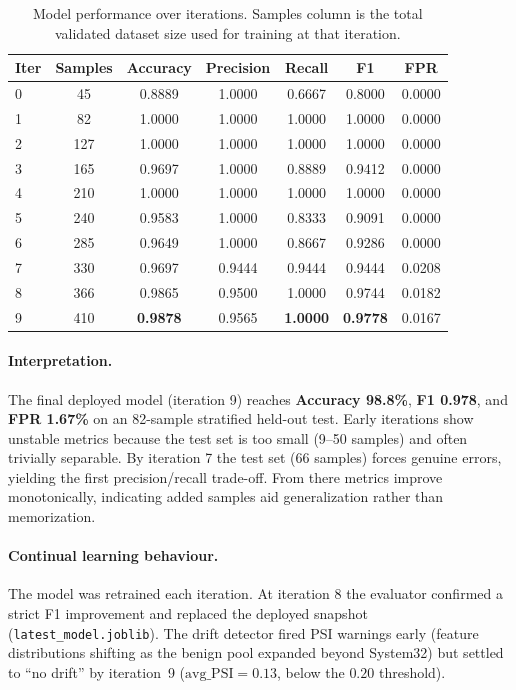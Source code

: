 \documentclass[12pt,a4paper]{article}
\begin{document}
\begin{table}[H]
\centering
\caption{Model performance over iterations. Samples column is the total validated dataset size used for training at that iteration.}
\label{tab:results}
\begin{tabular}{lcccccc}
\toprule
\textbf{Iter} & \textbf{Samples} & \textbf{Accuracy} & \textbf{Precision} & \textbf{Recall} & \textbf{F1} & \textbf{FPR} \\
\midrule
0 & 45  & 0.8889 & 1.0000 & 0.6667 & 0.8000 & 0.0000 \\
1 & 82  & 1.0000 & 1.0000 & 1.0000 & 1.0000 & 0.0000 \\
2 & 127 & 1.0000 & 1.0000 & 1.0000 & 1.0000 & 0.0000 \\
3 & 165 & 0.9697 & 1.0000 & 0.8889 & 0.9412 & 0.0000 \\
4 & 210 & 1.0000 & 1.0000 & 1.0000 & 1.0000 & 0.0000 \\
5 & 240 & 0.9583 & 1.0000 & 0.8333 & 0.9091 & 0.0000 \\
6 & 285 & 0.9649 & 1.0000 & 0.8667 & 0.9286 & 0.0000 \\
7 & 330 & 0.9697 & 0.9444 & 0.9444 & 0.9444 & 0.0208 \\
8 & 366 & 0.9865 & 0.9500 & 1.0000 & 0.9744 & 0.0182 \\
9 & 410 & \textbf{0.9878} & 0.9565 & \textbf{1.0000} & \textbf{0.9778} & 0.0167 \\
\bottomrule
\end{tabular}
\end{table}

\paragraph{Interpretation.} The final deployed model (iteration 9) reaches \textbf{Accuracy 98.8\%}, \textbf{F1 0.978}, and \textbf{FPR 1.67\%} on an 82-sample stratified held-out test. Early iterations show unstable metrics because the test set is too small (9--50 samples) and often trivially separable. By iteration 7 the test set (66 samples) forces genuine errors, yielding the first precision/recall trade-off. From there metrics improve monotonically, indicating added samples aid generalization rather than memorization.

\paragraph{Continual learning behaviour.} The model was retrained each iteration. At iteration 8 the evaluator confirmed a strict F1 improvement and replaced the deployed snapshot (\texttt{latest\_model.joblib}). The drift detector fired PSI warnings early (feature distributions shifting as the benign pool expanded beyond System32) but settled to ``no drift'' by iteration~9 ($\text{avg\_PSI}=0.13$, below the $0.20$ threshold).
\end{document}
